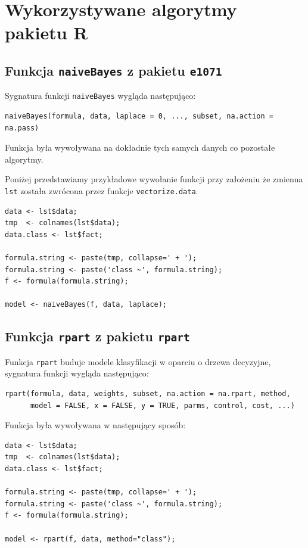 \documentclass[a4paper,12pt]{article}
\begin{document}
		\clearpage
	
\section{Wykorzystywane algorytmy pakietu R}

	\subsection{Funkcja \texttt{naiveBayes} z pakietu \texttt{e1071}}
	
	Sygnatura funkcji \texttt{naiveBayes} wygląda następująco:
\begin{verbatim}
naiveBayes(formula, data, laplace = 0, ..., subset, na.action = na.pass)
\end{verbatim}
	Funkcja była wywoływana na dokładnie tych samych danych co
	pozostałe algorytmy. 
	
	Poniżej przedstawiamy przykładowe 
	wywołanie funkcji przy założeniu że zmienna \texttt{lst}
	została zwrócona przez funkcje \texttt{vectorize.data}.
\begin{verbatim}
data <- lst$data;
tmp  <- colnames(lst$data);
data.class <- lst$fact;

formula.string <- paste(tmp, collapse=' + ');
formula.string <- paste('class ~', formula.string);
f <- formula(formula.string);

model <- naiveBayes(f, data, laplace);
\end{verbatim}
	
	\subsection{Funkcja \texttt{rpart} z pakietu \texttt{rpart}}
	
	Funkcja \texttt{rpart} buduje modele klasyfikacji w oparciu 
	o drzewa decyzyjne, sygnatura funkcji wygląda następująco:
\begin{verbatim}
rpart(formula, data, weights, subset, na.action = na.rpart, method,
      model = FALSE, x = FALSE, y = TRUE, parms, control, cost, ...)
\end{verbatim}
	
	Funkcja była wywoływana w następujący sposób:
\begin{verbatim}
data <- lst$data;
tmp  <- colnames(lst$data);
data.class <- lst$fact;

formula.string <- paste(tmp, collapse=' + ');
formula.string <- paste('class ~', formula.string);
f <- formula(formula.string);

model <- rpart(f, data, method="class");
\end{verbatim}
\end{document}
